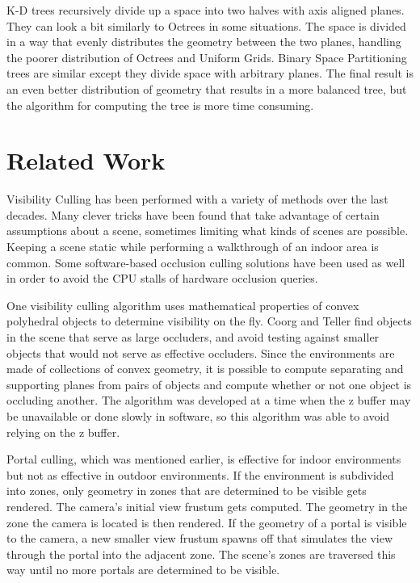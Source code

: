 \documentclass[12pt]{ucthesis}
\begin{document}
K-D trees recursively divide up a space into two halves with axis aligned planes.\cite{Vis-Computations-Densely-Occluded, Doom3-source-review}
They can look a bit similarly to Octrees in some situations.
The space is divided in a way that evenly distributes the geometry between the two planes, handling the poorer distribution of Octrees and Uniform Grids.
Binary Space Partitioning trees are similar except they divide space with arbitrary planes.
The final result is an even better distribution of geometry that results in a more balanced tree, but the algorithm for computing the tree is more time consuming.

\chapter{Related Work}
\label{related-work}

Visibility Culling has been performed with a variety of methods over the last decades.
Many clever tricks have been found that take advantage of certain assumptions about a scene, sometimes limiting what kinds of scenes are possible.
Keeping a scene static while performing a walkthrough of an indoor area is common.\cite{Vis-Computations-Densely-Occluded, Portals-mirrors, Doom3-source-review}
Some software-based occlusion culling solutions have been used as well in order to avoid the CPU stalls of hardware occlusion queries.\cite{spliter, culling-bf}

One visibility culling algorithm uses mathematical properties of convex polyhedral objects to determine visibility on the fly.\cite{large-occluders}
Coorg and Teller find objects in the scene that serve as large occluders, and avoid testing against smaller objects that would not serve as effective occluders.
Since the environments are made of collections of convex geometry, it is possible to compute separating and supporting planes from pairs of objects and compute whether or not one object is occluding another.
The algorithm was developed at a time when the z buffer may be unavailable or done slowly in software, so this algorithm was able to avoid relying on the z buffer.

Portal culling, which was mentioned earlier, is effective for indoor environments but not as effective in outdoor environments.\cite{Portals-mirrors}
If the environment is subdivided into zones, only geometry in zones that are determined to be visible gets rendered.
The camera's initial view frustum gets computed.
The geometry in the zone the camera is located is then rendered.
If the geometry of a portal is visible to the camera, a new smaller view frustum spawns off that simulates the view through the portal into the adjacent zone.
The scene's zones are traversed this way until no more portals are determined to be visible.
\end{document}
